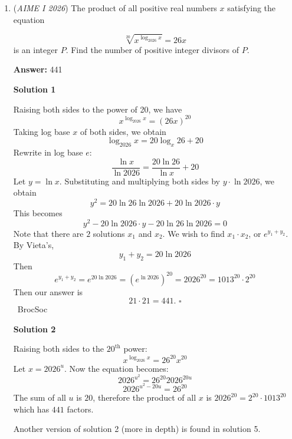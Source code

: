 \begin{enumerate}
Let $C$ be the intersection point of $AB'$ and $A'B$. Let $D$ be the point on $AB'$ such that $A'D$ is perpendicular to $AB'$. Let $CD=x$ and $A'D=y$. We know that $B'C=\frac{1}{2}$(because AA'B'B is a parallelogram), $A'B'=1$, and $A'C=\frac{2}{3}$. Then, by applying pythagorean theorem on $\triangle A'DB'$ and $\triangle A'DC$, we know that
 \[(x+\frac{1}{2})^2+y^2=1^2\]
 \[x^2+y^2=(\frac{2}{3})^2\]Solve for $x$ and get $x=\frac{11}{36}$For $\triangle ADC$, $\cos(\theta)=\frac{x+\frac{1}{2}}{1}=\frac{29}{36}$The answer is therefore $\boxed{065}$



	\item (\textit{AIME I 2026}) The product of all positive real numbers $x$ satisfying the equation 

 \[\sqrt[20]{x^{\log_{2026}x}}=26x\]
is an integer $P$. Find the number of positive integer divisors of $P$.


 
 \textbf{Answer: }441



\textbf{Solution 1}

Raising both sides to the power of 20, we have 
 \[x^{\log_{2026}x} = (26x)^{20}\] Taking log base $x$ of both sides, we obtain 
 \[\log_{2026}x = 20 \log_{x}26+20\] Rewrite in log base $e$: 
 \[\dfrac{\ln x}{\ln 2026} = \dfrac{20 \ln 26}{\ln x} + 20\] Let $y = \ln x$. Substituting and multiplying both sides by $y \cdot \ln 2026$, we obtain 
 \[y^2 = 20 \ln 26 \ln 2026 + 20 \ln 2026 \cdot y\] This becomes 
 \[y^2 - 20  \ln 2026 \cdot y - 20 \ln 26 \ln 2026 = 0\] Note that there are $2$ solutions $x_1$ and $x_2$. We wish to find $x_1 \cdot x_2$, or $e^{y_1 + y_2}$. By Vieta's, 
 \[y_1 + y_2 = 20 \ln 2026\] Then 
 \[e^{y_1 + y_2} = e^{20 \ln 2026} = (e^{\ln 2026})^{20} = 2026^{20} = 1013^{20} \cdot 2^{20}\] Then our answer is 
 \[21 \cdot 21 = \boxed{441} \text{. } \square\]~BrocSoc

 



\textbf{Solution 2}

Raising both sides to the $20^{\text{th}}$ power:
 \[x^{\log_{2026} x}=26^{20}x^{20}\]Let $x=2026^u$. Now the equation becomes:
 \[2026^{u^2}=26^{20}2026^{20u}\]
 \[2026^{u^2-20u}=26^{20}\]The sum of all $u$ is $20$, therefore the product of all $x$ is $2026^{20}=2^{20}\cdot 1013^{20}$ which has $\boxed{441}$ factors. 

 Another version of solution 2 (more in depth) is found in solution 5.


\end{enumerate}
